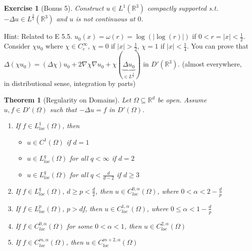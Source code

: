 \documentclass{report}
\theoremstyle{tommy}
\newtheorem{thm}[defn]{Theorem}
\newtheorem{ex}[defn]{Exercise}
\begin{document}
  \begin{ex}[Bonus 5]
    Construct \(u \in L^1(\mathbb{R}^3)\) compactly supported s.t. \(- \Delta u \in L^{\frac{3}{2}}(\mathbb{R}^3)\) and \(u\) is not continuous at \(0\).
  \end{ex}
  Hint: Related to E 5.5. \(u_0(x) = \omega(r) = \log(|\log(r)|)\) if \(0 < r = |x| < \frac{1}{2}\). Consider \(\chi u_0\) where \(\chi \in C_c^\infty\), \(\chi = 0\) if \(|x| > \frac{1}{2}\), \(\chi = 1\) if \(|x| < \frac{1}{4}\). You can prove that \(\Delta (\chi u_0) = (\Delta \chi) u_0 + 2 \nabla \chi \nabla u_0 + \chi(\underbrace{\Delta u_0}_{\in L^{\frac{3}{2}}})\) in \(D'(\mathbb{R}^3)\). (almost everywhere, in distributional sense, integration by parts)

  \begin{thm}[Regularity on Domains] Let \(\Omega \subseteq \mathbb{R}^d\) be open. Assume \(u, f \in D'(\Omega)\) such that \(- \Delta u = f\) in \(D'(\Omega)\).
    \begin{enumerate}[label=\alph*)]
      \item If \(f \in L_{loc}^1(\Omega)\), then \begin{itemize}
        \item \(u \in C^1(\Omega)\) if \(d = 1\)
        \item \(u \in L_{loc}^q(\Omega)\) for all \(q < \infty\) if \(d = 2\)
        \item \(u \in L_{loc}^q(\Omega)\) for all \(q < \frac{d}{d-2}\) if \(d \ge 3\)
      \end{itemize}
      \item If \(f \in L_{loc}^q(\Omega)\), \( d \ge p < \frac{d}{2}\), then \(u \in C_{loc}^{0, \alpha}(\Omega)\), where \(0 < \alpha < 2 - \frac{d}{p}\)
      \item If \(f \in L_{loc}^p(\Omega)\), \(p > d\)f, then \(u \in C_{loc}^{1, \alpha}(\Omega)\), where \(0 \le \alpha < 1 - \frac{d}{p}\)
      \item If \(f \in C_{loc}^{0, \alpha}(\Omega)\) for some \(0 < \alpha < 1\), then \(u \in C_{loc}^{2, \alpha}(\Omega)\)
      \item If \(f \in C_{loc}^{m, \alpha}(\Omega)\), then \(u \in C_{loc}^{m+2, \alpha}(\Omega)\)
    \end{enumerate}
  \end{thm}
\end{document}

